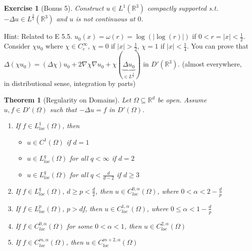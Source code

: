 \documentclass{report}
\theoremstyle{tommy}
\newtheorem{thm}[defn]{Theorem}
\newtheorem{ex}[defn]{Exercise}
\begin{document}
  \begin{ex}[Bonus 5]
    Construct \(u \in L^1(\mathbb{R}^3)\) compactly supported s.t. \(- \Delta u \in L^{\frac{3}{2}}(\mathbb{R}^3)\) and \(u\) is not continuous at \(0\).
  \end{ex}
  Hint: Related to E 5.5. \(u_0(x) = \omega(r) = \log(|\log(r)|)\) if \(0 < r = |x| < \frac{1}{2}\). Consider \(\chi u_0\) where \(\chi \in C_c^\infty\), \(\chi = 0\) if \(|x| > \frac{1}{2}\), \(\chi = 1\) if \(|x| < \frac{1}{4}\). You can prove that \(\Delta (\chi u_0) = (\Delta \chi) u_0 + 2 \nabla \chi \nabla u_0 + \chi(\underbrace{\Delta u_0}_{\in L^{\frac{3}{2}}})\) in \(D'(\mathbb{R}^3)\). (almost everywhere, in distributional sense, integration by parts)

  \begin{thm}[Regularity on Domains] Let \(\Omega \subseteq \mathbb{R}^d\) be open. Assume \(u, f \in D'(\Omega)\) such that \(- \Delta u = f\) in \(D'(\Omega)\).
    \begin{enumerate}[label=\alph*)]
      \item If \(f \in L_{loc}^1(\Omega)\), then \begin{itemize}
        \item \(u \in C^1(\Omega)\) if \(d = 1\)
        \item \(u \in L_{loc}^q(\Omega)\) for all \(q < \infty\) if \(d = 2\)
        \item \(u \in L_{loc}^q(\Omega)\) for all \(q < \frac{d}{d-2}\) if \(d \ge 3\)
      \end{itemize}
      \item If \(f \in L_{loc}^q(\Omega)\), \( d \ge p < \frac{d}{2}\), then \(u \in C_{loc}^{0, \alpha}(\Omega)\), where \(0 < \alpha < 2 - \frac{d}{p}\)
      \item If \(f \in L_{loc}^p(\Omega)\), \(p > d\)f, then \(u \in C_{loc}^{1, \alpha}(\Omega)\), where \(0 \le \alpha < 1 - \frac{d}{p}\)
      \item If \(f \in C_{loc}^{0, \alpha}(\Omega)\) for some \(0 < \alpha < 1\), then \(u \in C_{loc}^{2, \alpha}(\Omega)\)
      \item If \(f \in C_{loc}^{m, \alpha}(\Omega)\), then \(u \in C_{loc}^{m+2, \alpha}(\Omega)\)
    \end{enumerate}
  \end{thm}
\end{document}

